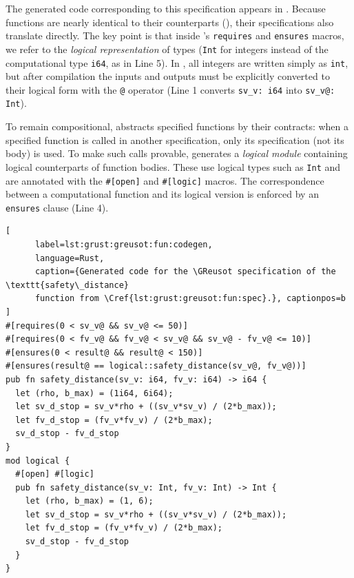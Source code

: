 The generated code corresponding to this specification appears in
. Because \GRSync functions are nearly identical to their
\Rust counterparts (), their specifications also translate
directly. The key point is that inside \Creusot's \texttt{requires} and \texttt{ensures} macros, we
refer to the \emph{logical representation} of types (\eg \texttt{Int} for integers instead of the
computational type \texttt{i64}, as in Line 5). In \GRust, all integers are written simply as
\texttt{int}, but after compilation the inputs and outputs must be explicitly converted to their
logical form with the \texttt{@} operator (\eg Line 1 converts \texttt{sv\_v: i64} into
\texttt{sv\_v@: Int}).

To remain compositional, \Creusot abstracts specified functions by their contracts: when a specified
function is called in another specification, only its specification (not its body) is used. To make
such calls provable, \GReusot generates a \emph{logical module} containing logical counterparts of
function bodies. These use logical types such as \texttt{Int} and are annotated with the
\texttt{\#[open]} and \texttt{\#[logic]} macros. The correspondence between a computational function
and its logical version is enforced by an \texttt{ensures} clause (Line 4).

\begin{lstlisting}[
      label=lst:grust:greusot:fun:codegen,
      language=Rust, 
      caption={Generated code for the \GReusot specification of the \texttt{safety\_distance}
      function from \Cref{lst:grust:greusot:fun:spec}.}, captionpos=b
]
#[requires(0 < sv_v@ && sv_v@ <= 50)]
#[requires(0 < fv_v@ && fv_v@ < sv_v@ && sv_v@ - fv_v@ <= 10)]
#[ensures(0 < result@ && result@ < 150)]
#[ensures(result@ == logical::safety_distance(sv_v@, fv_v@))]
pub fn safety_distance(sv_v: i64, fv_v: i64) -> i64 {
  let (rho, b_max) = (1i64, 6i64);
  let sv_d_stop = sv_v*rho + ((sv_v*sv_v) / (2*b_max));
  let fv_d_stop = (fv_v*fv_v) / (2*b_max);
  sv_d_stop - fv_d_stop
}
mod logical {
  #[open] #[logic]
  pub fn safety_distance(sv_v: Int, fv_v: Int) -> Int {
    let (rho, b_max) = (1, 6);
    let sv_d_stop = sv_v*rho + ((sv_v*sv_v) / (2*b_max));
    let fv_d_stop = (fv_v*fv_v) / (2*b_max);
    sv_d_stop - fv_d_stop
  }
}
\end{lstlisting}

